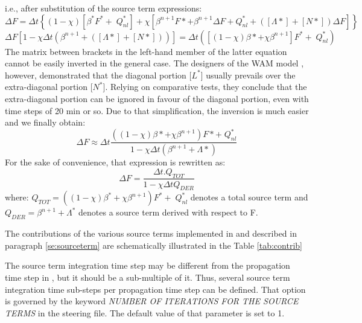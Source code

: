 i.e., after substitution of the source term expressions:
\begin{equation} \label{GrindEQ__6_19_}
\Delta F=\Delta t\left\{\left(1-\chi \right)\left[\beta^*F^*+\; Q_{nl}^{*} \right]+\chi \left[\beta ^{n+1} F*+\beta ^{n+1} \Delta F+Q_{nl}^{*} +\left(\left[\Lambda *\right]+\left[N*\right]\right)\Delta F\right]\right\}
\end{equation}
\begin{equation} \label{GrindEQ__6_20_}
\Delta F\left[1-\chi \Delta t\left(\beta ^{n+1} +\left(\left[\Lambda *\right]+\left[N*\right]\right)\right)\right]=\Delta t\left(\left[(1-\chi )\beta *+\chi \beta ^{n+1} \right]F^*+\; Q_{nl}^{*} \right)
\end{equation}
The matrix between brackets in the left-hand member of the latter equation cannot be easily inverted in the general case. The designers of the WAM model \cite{Wamdi1988}, however, demonstrated that the diagonal portion [$L^*$] usually prevails over the extra-diagonal portion [$N^*$]. Relying on comparative tests, they conclude that the extra-diagonal portion can be ignored in favour of the diagonal portion, even with time steps of 20 min or so. Due to that simplification, the inversion is much easier and we finally obtain:
\begin{equation} \label{GrindEQ__6_21_}
\Delta F\approx \Delta t\frac{\left((1-\chi )\beta *+\chi \beta ^{n+1} \right)F*+\; Q_{nl}^{*} }{1-\chi \Delta t\left(\beta ^{n+1} +\Lambda *\right)}
\end{equation}
For the sake of convenience, that expression is rewritten as:
\begin{equation} \label{GrindEQ__6_22_}
\Delta F=\frac{\Delta t.Q_{TOT} }{1-\chi \Delta tQ_{DER} }
\end{equation}
where: 
$Q_{TOT} =\left((1-\chi )\beta^*+\chi \beta ^{n+1} \right)F^*+\; Q_{nl}^{*} $ denotes a total source term
 and $Q_{DER} =\beta ^{n+1} +\Lambda^*$   denotes a source term derived with respect to F.

 The contributions of the various source terms implemented in \tomawac and described in paragraph \ref{se:sourceterm} are schematically illustrated in the Table \ref{tab:contrib}

 The source term integration time step may be different from the propagation time step in \tomawac, but it should be a sub-multiple of it. Thus, several source term integration time sub-steps per propagation time step can be defined. That option is governed by the keyword \textit{NUMBER OF ITERATIONS FOR THE SOURCE TERMS} in the steering file. The default value of that parameter is set to 1.

